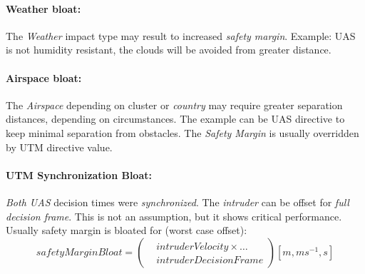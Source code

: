 \paragraph{Weather bloat:} The \emph{Weather} impact type may result to increased \emph{safety margin}. Example: UAS is not humidity resistant, the clouds will be avoided from greater distance.

\paragraph{Airspace bloat:} The \emph{Airspace} depending on cluster or \emph{country} may require greater separation distances, depending on circumstances. The example can be UAS directive to keep minimal separation from obstacles. The \emph{Safety Margin} is usually overridden by UTM directive value.

\paragraph{UTM Synchronization Bloat:} \emph{Both UAS} decision times were \emph{synchronized}. The \emph{intruder} can be offset for \emph{full decision frame}. This is not an assumption, but it shows critical performance. Usually safety margin is bloated for (worst case offset):
\begin{equation}\label{safetyMarginBloat}
    safetyMarginBloat = \left( \begin{aligned}
    &intruderVelocity \times\dots \\ &intruderDecisionFrame \end{aligned}\right)[m,ms^{-1},s]
\end{equation}
